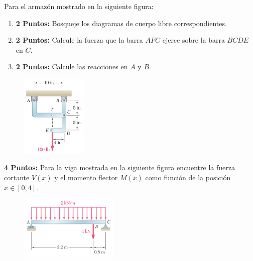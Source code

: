 \documentclass[ a4paper, twoside, 11pt]{article}
\begin{document}
\begin{problem}
Para el armaz\'on mostrado en la siguiente figura:
\begin{enumerate}[label=\textbf{\alph*)}]
\item \textbf{2 Puntos:} Bosqueje los diagramas de cuerpo libre correspondientes. 
\item \textbf{2 Puntos:} Calcule la fuerza que la barra $AFC$ ejerce sobre la barra $BCDE$ en $C$. 
\item \textbf{2 Puntos:} Calcule las reacciones en $A$ y $B$. 
\end{enumerate}

\begin{figure}[htb]
\centering
\includegraphics[width=0.28\textwidth]{prob-armazon.jpg}
\end{figure}

\end{problem}
\fullskip

\begin{problem}
\textbf{4 Puntos:} Para la viga mostrada en la siguiente figura encuentre la fuerza cortante $V(x)$ y el momento flector $M(x)$ como funci\'on de la posici\'on $x \in [0,4]$. 

\begin{figure}[htb]
\centering
\includegraphics[width=0.42\textwidth]{prob-vigas.jpg}
\end{figure}

\end{problem}
\fullskip
\end{document}
